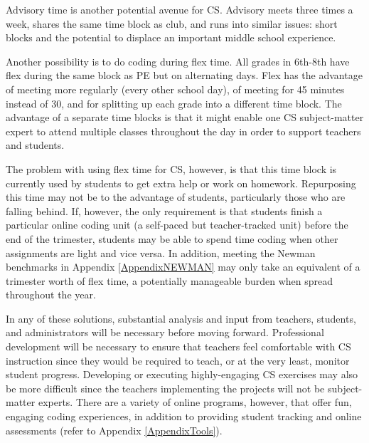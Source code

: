 Advisory time is another potential avenue for CS. Advisory meets three times a week, shares the same time block as club, and runs into similar issues: short blocks and the potential to displace an important middle school experience.   \par
Another possibility is to do coding during flex time. All grades in 6th-8th have flex during the same block as PE but on alternating days. Flex has the advantage of meeting more regularly (every other school day), of meeting for 45 minutes instead of 30, and for splitting up each grade into a different time block. The advantage of a separate time blocks is that it might enable one CS subject-matter expert to attend multiple classes throughout the day in order to support teachers and students. \par
The problem with using flex time for CS, however, is that this time block is currently used by students to get extra help or work on homework. Repurposing this time may not be to the advantage of students, particularly those who are falling behind. If, however, the only requirement is that students finish a particular online coding unit (a self-paced but teacher-tracked unit) before the end of the trimester, students may be able to spend time coding when other assignments are light and vice versa. In addition, meeting the Newman benchmarks in Appendix \ref{AppendixNEWMAN} may only take an equivalent of a trimester worth of flex time, a potentially manageable burden when spread throughout the year. \par 
In any of these solutions, substantial analysis and input from teachers, students, and administrators will be necessary before moving forward. Professional development will be necessary to ensure that teachers feel comfortable with CS instruction since they would be required to teach, or at the very least, monitor student progress. Developing or executing highly-engaging CS exercises may also be more difficult since the teachers implementing the projects will not be subject-matter experts. There are a variety of online programs, however, that offer fun, engaging coding experiences, in addition to providing student tracking and online assessments (refer to Appendix \ref{AppendixTools}). 


